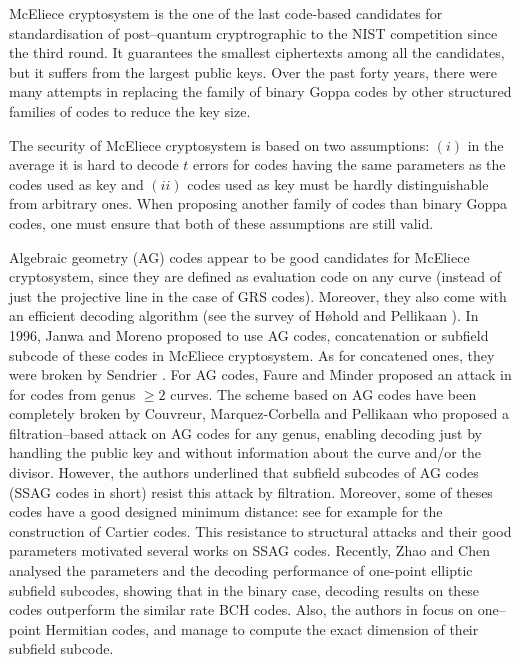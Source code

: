 \documentclass[a4paper]{article}
\theoremstyle{definition}
\theoremstyle{remark}
\begin{document}
McEliece cryptosystem is the one of the last code-based candidates for standardisation of post--quantum cryptrographic to the NIST competition since the third round. It guarantees the smallest ciphertexts among all the candidates, but it suffers from the largest public keys. Over the past forty years, there were many attempts in replacing the family of binary Goppa codes by other structured families of codes to reduce the key size.

The security of McEliece cryptosystem is based on two assumptions: $(i)$ in the average it is hard to decode $t$ errors for codes having the same parameters as the codes used as key and $(ii)$ codes used as key must be hardly distinguishable from arbitrary ones. When proposing another family of codes than binary Goppa codes, one must ensure that both of these assumptions are still valid.

Algebraic geometry (AG) codes appear to be good candidates for McEliece cryptosystem, since they are defined as evaluation code on any curve (instead of just the projective line in the case of GRS codes). Moreover, they also come with an efficient decoding algorithm (see the survey of Høhold and Pellikaan \cite{HP95}).
In 1996, Janwa and Moreno \cite{JM96} proposed to use AG codes, concatenation or subfield subcode of these codes in McEliece cryptosystem. As for concatened ones, they were broken by Sendrier \cite{Sen94}. For AG codes, Faure and Minder proposed an attack in \cite{FM08,Min07,Fau09} for codes from genus $\geq 2$ curves. The scheme based on AG codes have been completely broken by Couvreur, Marquez-Corbella and Pellikaan \cite{CMR17} who proposed a filtration--based attack on AG codes for any genus, enabling decoding just by handling the public key and without information about the curve and/or the divisor. However, the authors underlined that subfield subcodes of AG codes (SSAG codes in short) resist this attack by filtration. Moreover, some of theses codes have a good designed minimum distance: see for example \cite{Cou14} for the construction of Cartier codes. This resistance to structural attacks and their good parameters motivated several works on SSAG codes. Recently, Zhao and Chen \cite{ZC22} analysed the parameters and the decoding performance of one-point elliptic subfield subcodes, showing that in the binary case, decoding results on these codes outperform the similar rate BCH codes. Also, the authors in \cite{PJ14,EKN21} focus on one--point Hermitian codes, and manage to compute the exact dimension of their subfield subcode. 
\end{document}

